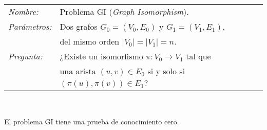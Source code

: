 \hfil

\begin{tabular}{|ll}
	\textit{Nombre:} & Problema GI (\textit{Graph Isomorphism}). \\
	\textit{Parámetros:} & Dos grafos $G_0 = (V_0, E_0)$ y $G_1 = (V_1, E_1)$, \\ & del mismo orden $\mid V_0 \mid = \mid V_1 \mid = n$. \\
	\textit{Pregunta:} & ¿Existe un isomorfismo $\pi : V_0 \rightarrow V_1$ tal que \\ & una arista $(u,v)\in E_0$ si y solo si $(\pi (u),\pi (v)) \in E_1$? \\
\end{tabular}
\\

\hfil

\begin{theorem}
	El problema GI tiene una prueba de conocimiento cero.
\end{theorem}


